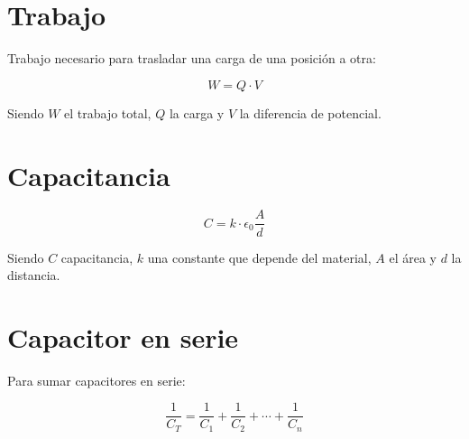 \section{Trabajo}

Trabajo necesario para trasladar una carga de una posición a otra:

\vspace{1cm}
\begin{equation}
    W = Q\cdot V
\end{equation}
\vspace{1cm}

Siendo \(W\) el trabajo total,
\(Q\) la carga y \(V\) la diferencia de potencial.

\section{Capacitancia}

\vspace{1cm}
\begin{equation}
    C = k\cdot\epsilon_0 \frac{A}{d}
\end{equation}
\vspace{1cm}

Siendo \(C\) capacitancia,
\(k\) una constante que depende del material,
\(A\) el área y \(d\) la distancia.

\section{Capacitor en serie}

Para sumar capacitores en serie:

\vspace{1cm}
\begin{equation}
    \frac{1}{C_T} = \frac{1}{C_1} + \frac{1}{C_2}  + \cdots + \frac{1}{C_n} 
\end{equation}
\vspace{1cm}
